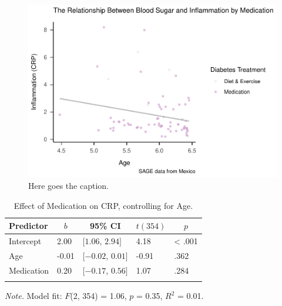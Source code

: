 \documentclass[
  man]{apa6}
\begin{document}
\begin{figure}[H]
\includegraphics{NEW_Final_Groupof5_files/figure-latex/tian-filtering-1} \caption{Here goes the caption.}\label{fig:tian-filtering}
\end{figure}



\begin{table}[tbp]

\begin{center}
\begin{threeparttable}

\caption{\label{tab:regtab1}Effect of Medication on CRP, controlling for Age. }

\begin{tabular}{lllll}
\toprule
Predictor & \multicolumn{1}{c}{$b$} & \multicolumn{1}{c}{95\% CI} & \multicolumn{1}{c}{$t(354)$} & \multicolumn{1}{c}{$p$}\\
\midrule
Intercept & 2.00 & $[1.06$, $2.94]$ & 4.18 & < .001\\
Age & -0.01 & $[-0.02$, $0.01]$ & -0.91 & .362\\
Medication & 0.20 & $[-0.17$, $0.56]$ & 1.07 & .284\\
\bottomrule
\addlinespace
\end{tabular}

\begin{tablenotes}[para]
\normalsize{\textit{Note.} Model fit: $F$(2, 354) = 1.06, $p$ = 0.35, $R^2$ = 0.01.}
\end{tablenotes}

\end{threeparttable}
\end{center}

\end{table}
\end{document}
